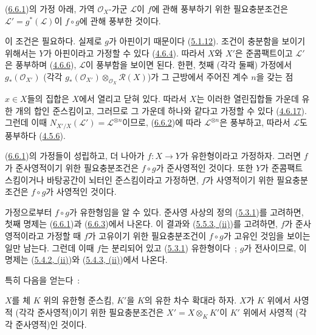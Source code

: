 \begin{corollary}[6.6.3]
\label{II.6.6.3-ko}
(\hyperref[II.6.6.1-ko]{6.6.1})의 가정 아래, 가역
$\mathcal{O}_X$-가군 $\mathcal{L}$이 $f$에 관해 풍부하기 위한
필요충분조건은 $\mathcal{L}'=g^*(\mathcal{L})$이 $f\circ g$에 관해
풍부한 것이다.
\end{corollary}

이 조건은 필요하다. 실제로 $g$가 아핀이기 때문이다
(\hyperref[II.5.1.12-ko]{5.1.12}). 조건이 충분함을 보이기 위해서는
$Y$가 아핀이라고 가정할 수 있다 (\hyperref[II.4.6.4-ko]{4.6.4}).
따라서 $X$와 $X'$은 준콤팩트이고 $\mathcal{L}'$은 풍부하며
(\hyperref[II.4.6.6-ko]{4.6.6}), $\mathcal{L}$이 풍부함을 보이면 된다.
한편, 첫째 (각각 둘째) 가정에서
$g_*(\mathcal{O}_{X'})$ (각각
$g_*(\mathcal{O}_{X'})\otimes_{\mathcal{O}_X}\mathcal{R}(X)$)가 그
근방에서 주어진 계수 $n$을 갖는 점


$x\in X$들의 집합은 $X$에서 열리고 닫혀 있다. 따라서 $X$는 이러한
열린집합들 가운데 유한 개의 합인 준스킴이고, 그러므로 그 가운데 하나와
같다고 가정할 수 있다 (\hyperref[II.4.6.17-ko]{4.6.17}). 그런데 이때
$N_{X'/X}(\mathcal{L}')=\mathcal{L}^{\otimes n}$이므로,
(\hyperref[II.6.6.2-ko]{6.6.2})에 따라
$\mathcal{L}^{\otimes n}$은 풍부하고, 따라서 $\mathcal{L}$도 풍부하다
(\hyperref[II.4.5.6-ko]{4.5.6}).

\begin{corollary}[6.6.4]
\label{II.6.6.4-ko}
(\hyperref[II.6.6.1-ko]{6.6.1})의 가정들이 성립하고, 더 나아가
$f:X\to Y$가 유한형이라고 가정하자. 그러면 $f$가 준사영적이기 위한
필요충분조건은 $f\circ g$가 준사영적인 것이다. 또한 $Y$가 준콤팩트
스킴이거나 바탕공간이 뇌터인 준스킴이라고 가정하면, $f$가 사영적이기
위한 필요충분조건은 $f\circ g$가 사영적인 것이다.
\end{corollary}

가정으로부터 $f\circ g$가 유한형임을 알 수 있다. 준사영 사상의 정의
(\hyperref[II.5.3.1-ko]{5.3.1})를 고려하면, 첫째 명제는
(\hyperref[II.6.6.1-ko]{6.6.1})과
(\hyperref[II.6.6.3-ko]{6.6.3})에서 나온다. 이 결과와
(\hyperref[II.5.5.3-ko]{5.5.3, (ii)})를 고려하면, $f$가
준사영적이라고 가정할 때 $f$가 고유이기 위한 필요충분조건이
$f\circ g$가 고유인 것임을 보이는 일만 남는다. 그런데 이때 $f$는
분리되어 있고 (\hyperref[II.5.3.1-ko]{5.3.1}) 유한형이다~; $g$가
전사이므로, 이 명제는 (\hyperref[II.5.4.2-ko]{5.4.2, (ii)})와
(\hyperref[II.5.4.3-ko]{5.4.3, (ii)})에서 나온다.

특히 다음을 얻는다~:

\begin{corollary}[6.6.5]
\label{II.6.6.5-ko}
$X$를 체 $K$ 위의 유한형 준스킴, $K'$을 $K$의 유한 차수 확대라 하자.
$X$가 $K$ 위에서 사영적 (각각 준사영적)이기 위한 필요충분조건은
$X'=X\otimes_K K'$이 $K'$ 위에서 사영적 (각각 준사영적)인 것이다.
\end{corollary}

